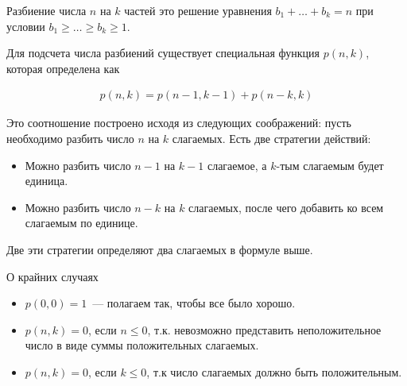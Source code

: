 
\begin{definition}
  Разбиение числа \(n\) на \(k\) частей это решение уравнения
  \(b_{1} + \dotsc + b_{k} = n\) при условии
  \(b_{1} \ge \dots \ge b_{k} \ge 1\).
\end{definition}

Для подсчета числа разбиений существует специальная функция \(p(n, k)\), которая
определена как

\begin{align*}
  p(n, k) = p(n - 1, k - 1) + p(n - k, k)
\end{align*}

Это соотношение построено исходя из следующих соображений: пусть необходимо
разбить число \(n\) на \(k\) слагаемых. Есть две стратегии действий:

\begin{itemize}
  \item Можно разбить число \(n - 1\) на \(k - 1\) слагаемое, а \(k\)-тым
  слагаемым будет единица.

  \item Можно разбить число \(n - k\) на \(k\) слагаемых, после чего добавить ко
  всем слагаемым по единице.
\end{itemize}

Две эти стратегии определяют два слагаемых в формуле выше.

\begin{remark}
  О крайних случаях

  \begin{itemize}
    \item \(p(0, 0) = 1\)~--- полагаем так, чтобы все было хорошо.
    
    \item \(p(n, k) = 0\), если \(n \le 0\), т.к. невозможно представить
    неположительное число в виде суммы положительных слагаемых.

    \item \(p(n, k) = 0\), если \(k \le 0\), т.к число слагаемых должно быть
    положительным.
  \end{itemize}
\end{remark}
